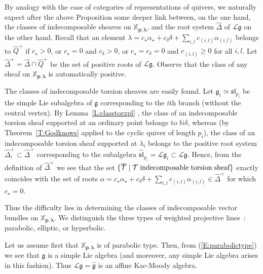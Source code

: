 \documentclass[a4paper,10pt]{amsart}
\def\N{\mathbb{N}}
\def\a{\alpha}
\def\g{\mathfrak{g}}
\def\xpl{\mathbb{X}_{\mathbf{p},\boldsymbol{\lambda}}}
\numberwithin{equation}{section}
\begin{document}
{\vspace{.15in}

By analogy with the case of categories of representations of quivers, we naturally expect after the above Proposition some
deeper link between, on the one hand, the classes of indecomposable sheaves on $\xpl$, and the root system $\widehat{\Delta}$ of $\mathcal{L}\g$ on the other hand. Recall that an element
$\lambda=c_{\star}\a_{\star}+c_{\delta}\delta +\sum_{i,l} c_{(i,l)}\a_{(i,l)}$ belongs to $\widehat{Q}^+$ if $c_{\star} >0$, or $c_{\star}=0$ and $c_\delta >0$, or $c_{\star}=c_{\delta}=0$ and $c_{(i,l)} \geq 0$ for all $i,l$. Let $\widehat{\Delta}^+=\widehat{\Delta} \cap \widehat{Q}^+$ be the set of positive roots of $\mathcal{L}\g$. Observe that the class of any sheaf on $\xpl$ is automatically positive.

\vspace{.1in}

The classes of indecomposable torsion sheaves are easily found. Let $\g_i \simeq \mathfrak{sl}_{p_i}$ be the simple Lie subalgebra of $\g$ corresponding to the $i$th branch (without the central vertex). By Lemma~\ref{L:classtorxpl} , the class of an indecomposable torsion sheaf supported at an ordinary point belongs to $\N\delta$, whereas (by Theorem~\ref{T:Godknows} applied to the cyclic quiver of length $p_i$), the class of an indecomposable torsion sheaf supported at $\lambda_i$ belongs to the positive root system $\widehat{\Delta}^+_i \subset \widehat{\Delta}^+$ corresponding to the subalgebra $\widehat{\mathfrak{sl}}_{p_i} =\mathcal{L}\g_i \subset \mathcal{L}\g$. Hence, from the definition of $\widehat{\Delta}^+$ we see that the set $\{\overline{\mathcal{T}}\;|\; \mathcal{T}\;\text{indecomposable\;torsion\;sheaf}\}$ exactly coincides with the set of roots $\a=c_{\star}\a_{\star}+c_{\delta}\delta +\sum_{i,l} c_{(i,l)}\a_{(i,l)} \in \widehat{\Delta}^+$ for which $c_{\star}=0$.

Thus the difficulty lies in determining the classes of indecomposable vector bundles on $\xpl$. We distinguish the three types of weighted projective lines~: parabolic, elliptic, or hyperbolic.


\vspace{.15in}

Let us assume first that $\xpl$ is of parabolic type. Then, from (\ref{E:parabolictype}) we see that $\g$ is a simple Lie algebra (and moreover, any simple Lie algebra arises in this fashion). Thus $\mathcal{L}\g=\widehat{\g}$ is an affine Kac-Moody algebra.

}
\end{document}
